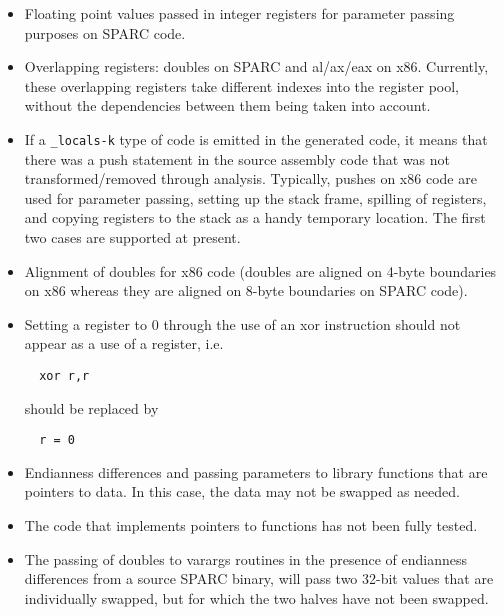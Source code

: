 \begin{itemize}
\item Floating point values passed in integer registers for parameter passing 
  purposes on SPARC code.  

\item Overlapping registers: doubles on SPARC and al/ax/eax on x86.  
  Currently, these overlapping registers take different indexes into the
  register pool, without the dependencies between them being taken into 
  account.  

\item If a \verb!_locals-k! type of code is emitted in the generated 
  code, it means that there was a push statement in the source assembly 
  code that was not transformed/removed through analysis.  Typically, 
  pushes on x86 code are used for parameter passing, setting up the
  stack frame, spilling of registers, and copying registers to the 
  stack as a handy temporary location.  The first two cases are 
  supported at present. 

\item Alignment of doubles for x86 code (doubles are aligned on 4-byte 
  boundaries on x86 whereas they are aligned on 8-byte boundaries on 
  SPARC code).

\item Setting a register to 0 through the use of an xor instruction should 
  not appear as a use of a register, i.e. 
  \begin{verbatim}
  xor r,r
  \end{verbatim}
  should be replaced by
  \begin{verbatim}
  r = 0
  \end{verbatim}

\item Endianness differences and passing parameters to library functions 
  that are pointers to data.  In this case, the data may not be swapped 
  as needed. 

\item The code that implements pointers to functions has not been fully 
  tested. 

\item The passing of doubles to varargs routines in the presence of 
  endianness differences from a source SPARC binary, will pass two 
  32-bit values that are individually swapped, but for which the two 
  halves have not been swapped.  

\end{itemize}

